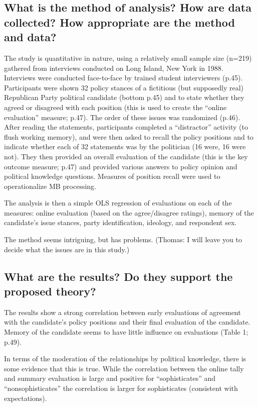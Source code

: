 \documentclass[a4paper]{exam}
\begin{document}
\subsection{What is the method of analysis? How are data collected? How appropriate are the method and data?}

The study is quantitative in nature, using a relatively small sample size (n=219) gathered from interviews conducted on Long Island, New York in 1988. Interviews were conducted face-to-face by trained student interviewers (p.45). Participants were shown 32 policy stances of a fictitious (but supposedly real) Republican Party political candidate (bottom p.45) and to state whether they agreed or disagreed with each position (this is used to create the ``online evaluation'' measure; p.47). The order of these issues was randomized (p.46). After reading the statements, participants completed a ``distractor'' activity (to flush working memory), and were then asked to recall the policy positions and to indicate whether each of 32 statements was by the politician (16 were, 16 were not). They then provided an overall evaluation of the candidate (this is the key outcome measure; p.47) and provided various answers to policy opinion and political knowledge questions. Measures of position recall were used to operationalize MB processing.

The analysis is then a simple OLS regression of evaluations on each of the measures: online evaluation (based on the agree/disagree ratings), memory of the candidate's issue stances, party identification, ideology, and respondent sex.

The method seems intriguing, but has problems. (Thomas: I will leave you to decide what the issues are in this study.)

\subsection{What are the results? Do they support the proposed theory?}

The results show a strong correlation between early evaluations of agreement with the candidate's policy positions and their final evaluation of the candidate. Memory of the candidate seems to have little influence on evaluations (Table 1; p.49).

In terms of the moderation of the relationships by political knowledge, there is some evidence that this is true. While the correlation between the online tally and summary evaluation is large and positive for ``sophisticates'' and ``nonsophisticates'' the correlation is larger for sophisticates (consistent with expectations).
\end{document}
